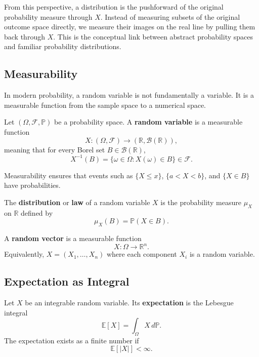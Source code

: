 From this perspective, a distribution is the pushforward of the original probability measure through $X$. Instead of measuring subsets of the original outcome space directly, we measure their images on the real line by pulling them back through $X$. This is the conceptual link between abstract probability spaces and familiar probability distributions.

\subsection{Measurability}

In modern probability, a random variable is not fundamentally a variable. It is a measurable function from the sample space to a numerical space.

\begin{definition}
Let $(\Omega,\mathcal{F},\mathbb{P})$ be a probability space. A \textbf{random variable} is a measurable function
\[
    X:(\Omega,\mathcal{F})\to(\mathbb{R},\mathcal{B}(\mathbb{R})),
\]
meaning that for every Borel set $B\in\mathcal{B}(\mathbb{R})$,
\[
    X^{-1}(B)=\{\omega\in\Omega:X(\omega)\in B\}\in\mathcal{F}.
\]
\end{definition}

\begin{remark}
Measurability ensures that events such as $\{X\leq x\}$, $\{a<X<b\}$, and $\{X\in B\}$ have probabilities.
\end{remark}

\begin{definition}[Distribution]
The \textbf{distribution} or \textbf{law} of a random variable $X$ is the probability measure $\mu_X$ on $\mathbb{R}$ defined by
\[
    \mu_X(B)=\mathbb{P}(X\in B).
\]
\end{definition}

\begin{definition}
A \textbf{random vector} is a measurable function
\[
    X:\Omega\to\mathbb{R}^n.
\]
Equivalently, $X=(X_1,\dots,X_n)$ where each component $X_i$ is a random variable.
\end{definition}

\subsection{Expectation as Integral}

\begin{definition}[Expectation]
Let $X$ be an integrable random variable. Its \textbf{expectation} is the Lebesgue integral
\[
    \mathbb{E}[X]=\int_\Omega X\,d\mathbb{P}.
\]
The expectation exists as a finite number if
\[
    \mathbb{E}[|X|]<\infty.
\]
\end{definition}

